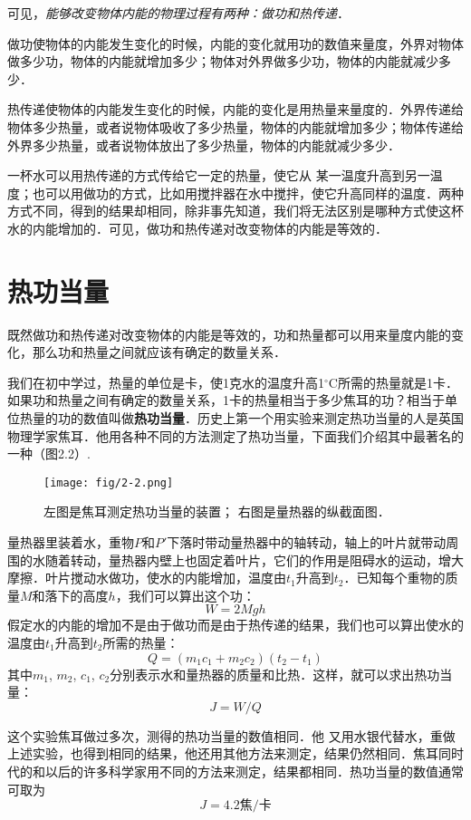 可见，\textit{能够改变物体内能的物理过程有两种：做功和热传递}．

做功使物体的内能发生变化的时候，内能的变化就用功的数值来量度，外界对物体做多少功，物体的内能就增加多少；物体对外界做多少功，物体的内能就减少多少．

热传递使物体的内能发生变化的时候，内能的变化是用热量来量度的．外界传递给物体多少热量，或者说物体吸收了多少热量，物体的内能就增加多少；物体传递给外界多少热量，或者说物体放出了多少热量，物体的内能就减少多少．

一杯水可以用热传递的方式传给它一定的热量，使它从
某一温度升高到另一温度；也可以用做功的方式，比如用搅拌器在水中搅拌，使它升高同样的温度．两种方式不同，得到的结果却相同，除非事先知道，我们将无法区别是哪种方式使这杯水的内能增加的．可见，做功和热传递对改变物体的内能是等效的．

\section{热功当量}
既然做功和热传递对改变物体的内能是等效的，功和热量都可以用来量度内能的变化，那么功和热量之间就应该有确定的数量关系．

我们在初中学过，热量的单位是卡，使1克水的温度升高1$^\circ$C所需的热量就是1卡．如果功和热量之间有确定的数量关系，1卡的热量相当于多少焦耳的功？相当于单位热量的功的数值叫做\textbf{热功当量}．历史上第一个用实验来测定热功当量的人是英国物理学家焦耳．他用各种不同的方法测定了热功当量，下面我们介绍其中最著名的一种（图2.2）.

\begin{figure}[htp]
\centering\texttt{[image: fig/2-2.png]}
\caption{左图是焦耳测定热功当量的装置；
右图是量热器的纵截面图．}
\end{figure}


量热器里装着水，重物$P$和$P'$下落时带动量热器中的轴转动，轴上的叶片就带动周围的水随着转动，量热器内壁上也固定着叶片，它们的作用是阻碍水的运动，增大摩擦．叶片搅动水做功，使水的内能增加，温度由$t_1$升高到$t_2$．已知每个重物的质量$M$和落下的高度$h$，我们可以算出这个功：
$$W=2Mgh $$
假定水的内能的增加不是由于做功而是由于热传递的结果，我们也可以算出使水的温度由$t_1$升高到$t_2$所需的热量：
\[Q=(m_1c_1+m_2c_2)(t_2-t_1)\]
其中$m_1$, $m_2$, $c_1$, $c_2$分别表示水和量热器的质量和比热．这样，就可以求出热功当量：
\[J=W/Q\]

这个实验焦耳做过多次，测得的热功当量的数值相同．他
又用水银代替水，重做上述实验，也得到相同的结果，他还用其他方法来测定，结果仍然相同．焦耳同时代的和以后的许多科学家用不同的方法来测定，结果都相同．热功当量的数值通常可取为
\[ J=4.2\text{焦/卡} \]

